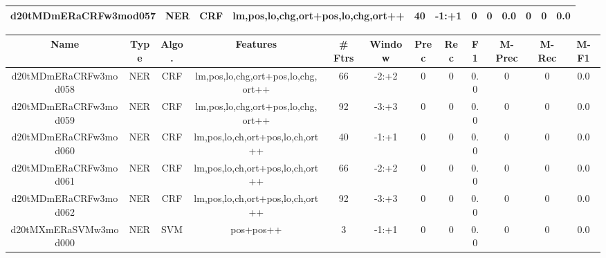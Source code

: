 \documentclass[a4paper]{article}
\begin{document}
\begin{landscape}
\begin{center}
\begin{tabular}{ |c|c|c|c|c|c|c|c|c|c|c|c|}
 
 	
 	\small{ d20tMDmERaCRFw3mod057 } & \small{ NER} & \small{  CRF }  & lm,pos,lo,chg,ort+pos,lo,chg,ort++  &  40 &  \small{  -1:+1 }  &  0 & 0 & 0.0  &  0 & 0 & 0.0 \\
 	
 \hline
\end{tabular}
\end{center}




\begin{center}
\begin{tabular}{ |c|c|c|c|c|c|c|c|c|c|c|c|} 
 \hline
 	Name & Type & Algo. & Features & \# Ftrs & Window & Prec & Rec & F1 & M-Prec & M-Rec & M-F1\\
 \hline

 	

 
 	
 	\small{ d20tMDmERaCRFw3mod058 } & \small{ NER} & \small{  CRF }  & lm,pos,lo,chg,ort+pos,lo,chg,ort++  &  66 &  \small{  -2:+2 }  &  0 & 0 & 0.0  &  0 & 0 & 0.0 \\
 	

 
 	
 	\small{ d20tMDmERaCRFw3mod059 } & \small{ NER} & \small{  CRF }  & lm,pos,lo,chg,ort+pos,lo,chg,ort++  &  92 &  \small{  -3:+3 }  &  0 & 0 & 0.0  &  0 & 0 & 0.0 \\
 	

 
 	
 	\small{ d20tMDmERaCRFw3mod060 } & \small{ NER} & \small{  CRF }  & lm,pos,lo,ch,ort+pos,lo,ch,ort++  &  40 &  \small{  -1:+1 }  &  0 & 0 & 0.0  &  0 & 0 & 0.0 \\
 	

 
 	
 	\small{ d20tMDmERaCRFw3mod061 } & \small{ NER} & \small{  CRF }  & lm,pos,lo,ch,ort+pos,lo,ch,ort++  &  66 &  \small{  -2:+2 }  &  0 & 0 & 0.0  &  0 & 0 & 0.0 \\
 	

 
 	
 	\small{ d20tMDmERaCRFw3mod062 } & \small{ NER} & \small{  CRF }  & lm,pos,lo,ch,ort+pos,lo,ch,ort++  &  92 &  \small{  -3:+3 }  &  0 & 0 & 0.0  &  0 & 0 & 0.0 \\
 	

 
 	
 	\small{ d20tMXmERaSVMw3mod000 } & \small{ NER} & \small{  SVM }  & pos+pos++  &  3 &  \small{  -1:+1 }  &  0 & 0 & 0.0  &  0 & 0 & 0.0 \\
 	


\end{tabular}
\end{center}
\end{landscape}
\end{document}
